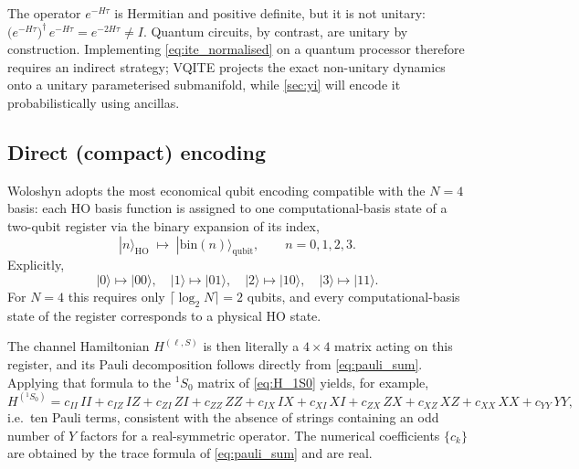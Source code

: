 \begin{remark}
The operator $e^{-H\tau}$ is Hermitian and positive definite, but it is
not unitary: $\bigl(e^{-H\tau}\bigr)^{\dagger}\,e^{-H\tau} = e^{-2H\tau}
\neq I$. Quantum circuits, by contrast, are unitary by construction.
Implementing \cref{eq:ite_normalised} on a quantum processor therefore
requires an indirect strategy; VQITE projects the exact non-unitary
dynamics onto a unitary parameterised submanifold, while \cref{sec:yi}
will encode it probabilistically using ancillas.
\end{remark}

\subsection{Direct (compact) encoding}
\label{ssec:direct_encoding}

Woloshyn adopts the most economical qubit encoding compatible with the
$N=4$ basis: each HO basis function is assigned to one computational-basis
state of a two-qubit register via the binary expansion of its index,
\begin{equation}
  \label{eq:direct_map}
  |n\rangle_{\mathrm{HO}}
  \;\longmapsto\;
  |\mathrm{bin}(n)\rangle_{\mathrm{qubit}},
  \qquad n = 0,1,2,3.
\end{equation}
Explicitly,
\begin{equation}
  |0\rangle \mapsto |00\rangle,\quad
  |1\rangle \mapsto |01\rangle,\quad
  |2\rangle \mapsto |10\rangle,\quad
  |3\rangle \mapsto |11\rangle.
\end{equation}
For $N=4$ this requires only $\lceil\log_2 N\rceil = 2$ qubits, and every
computational-basis state of the register corresponds to a physical HO
state.

The channel Hamiltonian $H^{(\ell,S)}$ is then literally a $4\times 4$
matrix acting on this register, and its Pauli decomposition follows
directly from \cref{eq:pauli_sum}. Applying that formula to the ${}^1S_0$
matrix of \cref{eq:H_1S0} yields, for example,
\begin{equation}
  \label{eq:direct_decomp_1S0}
  H^{({}^1S_0)} =
  c_{II}\,II + c_{IZ}\,IZ + c_{ZI}\,ZI + c_{ZZ}\,ZZ
  + c_{IX}\,IX + c_{XI}\,XI + c_{ZX}\,ZX + c_{XZ}\,XZ
  + c_{XX}\,XX + c_{YY}\,YY,
\end{equation}
i.e.\ ten Pauli terms, consistent with the absence of strings containing
an odd number of $Y$ factors for a real-symmetric operator. The numerical
coefficients $\{c_k\}$ are obtained by the trace formula of
\cref{eq:pauli_sum} and are real.

